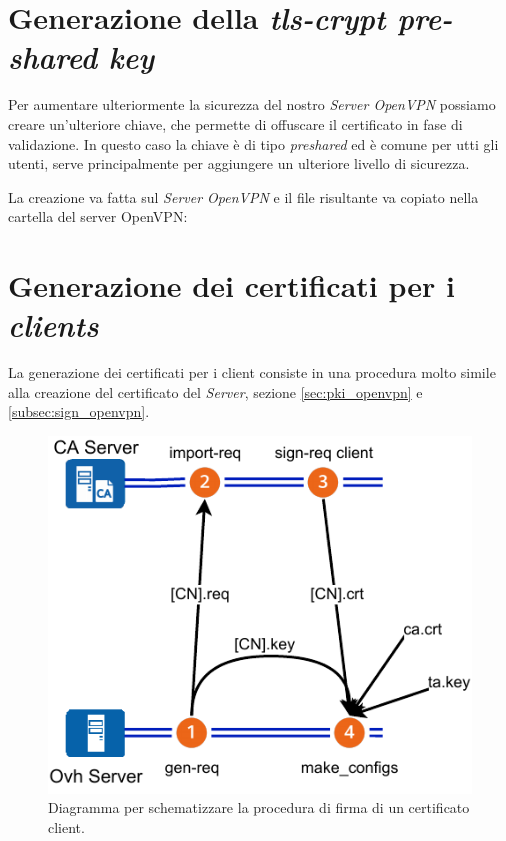 \section{Generazione della \textit{tls-crypt pre-shared key} \ok}
\label{sec:tls-crypt}

Per aumentare ulteriormente la sicurezza del nostro \textit{Server OpenVPN} possiamo creare un'ulteriore chiave, che permette di offuscare il certificato in fase di validazione. In questo caso la chiave è di tipo \textit{preshared} ed è comune per utti gli utenti, serve principalmente per aggiungere un ulteriore livello di sicurezza.

La creazione va fatta sul \textit{Server OpenVPN} e il file risultante va copiato nella cartella del server OpenVPN:


\section{Generazione dei certificati per i \textit{clients} \ok}
\label{sec:client_keys}

La generazione dei certificati per i client consiste in una procedura molto simile alla creazione del certificato del \textit{Server}, sezione \ref{sec:pki_openvpn} e \ref{subsec:sign_openvpn}.

\begin{figure}[H]
    \centering
    \includegraphics[width=0.6\linewidth]{immagini/diag-firma_certificato_client}
    \caption{Diagramma per schematizzare la procedura di firma di un certificato client.}
    \label{fig:diag-firma_certificato_client}
\end{figure}

